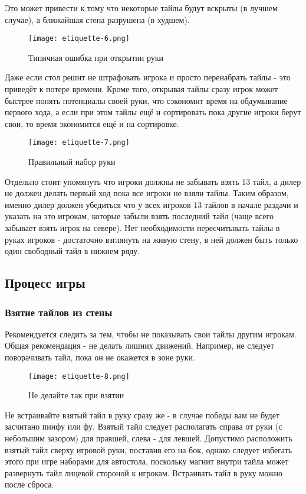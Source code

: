 Это может привести к тому что некоторые тайлы будут вскрыты (в лучшем случае), а ближайшая стена разрушена (в худшем).

\begin{figure}[H]
	\centering
	\texttt{[image: etiquette-6.png]}
	\caption{Типичная ошибка при открытии руки}
\end{figure}

Даже если стол решит не штрафовать игрока и просто перенабрать тайлы - это приведёт к потере времени. Кроме того, открывая тайлы сразу игрок может быстрее понять потенциалы своей руки, что сэкономит время на обдумывание первого хода, а если при этом тайлы ещё и сортировать пока другие игроки берут свои, то время экономится ещё и на сортировке.

\begin{figure}[H]
	\centering
	\texttt{[image: etiquette-7.png]}
	\caption{Правильный набор руки}
\end{figure}

Отдельно стоит упомянуть что игроки должны не забывать взять 13 тайл, а дилер не должен делать первый ход пока все игроки не взяли тайлы. Таким образом, именно дилер должен убедиться что у всех игроков 13 тайлов в начале раздачи и указать на это игрокам, которые забыли взять последний тайл (чаще всего забывает взять игрок на севере). Нет необходимости пересчитывать тайлы в руках игроков - достаточно взглянуть на живую стену, в ней должен быть только один свободный тайл в нижнем ряду. 

\subsection{Процесс игры}

\subsubsection{Взятие тайлов из стены}

Рекомендуется следить за тем, чтобы не показывать свои тайлы другим игрокам. Общая рекомендация - не делать лишних движений. Например, не следует поворачивать тайл, пока он не окажется в зоне руки.

\begin{figure}[H]
	\centering
	\texttt{[image: etiquette-8.png]}
	\caption{Не делайте так при взятии}
\end{figure}

Не встраивайте взятый тайл в руку сразу же - в случае победы вам не будет засчитано пинфу или фу. Взятый тайл следует располагать справа от руки (с небольшим зазором) для правшей, слева - для левшей. Допустимо расположить взятый тайл сверху игровой руки, поставив его на бок, однако следует избегать этого при игре наборами для автостола, поскольку магнит внутри тайла может развернуть тайл лицевой стороной к игрокам. Встраивать тайл в руку можно после сброса.


